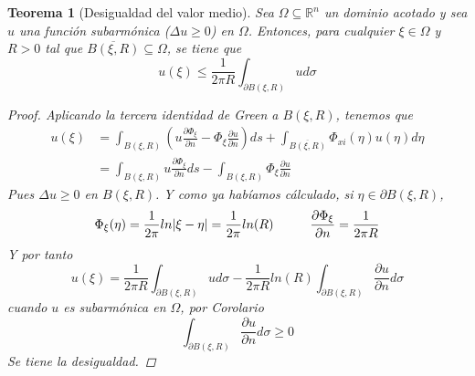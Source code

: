 \documentclass[11pt]{book}
\theoremstyle{plain}
\newtheorem{teo}[proposición]{Teorema}
\theoremstyle{definition}
\newcommand{\R}{\mathbb{R}}
\begin{document}
    \begin{teo}[Desigualdad del valor medio]
        Sea $\Omega \subseteq \R^{n}$ un dominio acotado y sea $u$ una función subarmónica ($\Delta u \geq 0$) en $\Omega$. Entonces, para cualquier $\xi\in\Omega$ y $R > 0$ tal que $\overline{B(\xi,R)} \subseteq \Omega$, se tiene que
        \[
            u(\xi) \leq \frac{1}{2\pi R}\int_{\partial B(\xi,R)} u d\sigma
        \]
        \begin{proof}
            Aplicando la tercera identidad de Green a $B(\xi,R)$, tenemos que
            \begin{align*}
                u(\xi) &= \int_{B(\xi,R)} \left(u\frac{\partial \Phi_{\xi}}{\partial n} - \Phi_{\xi}\frac{\partial u}{\partial n}\right) ds + \int_{\overline{B(\xi, R)}} \Phi_{xi}(\eta)u(\eta)d\eta\\
                        &= \int_{B(\xi,R)} u\frac{\partial \Phi_{\xi}}{\partial n} ds - \int_{B(\xi,R)} \Phi_{\xi}\frac{\partial u}{\partial n}
            \end{align*}
            Pues $\Delta u \geq 0$ en $B(\xi,R)$. Y como ya habíamos cálculado, si $\eta\in \partial B(\xi, R)$,
            \[
                \Phi_{\xi}(\eta) = \frac{1}{2\pi}ln|\xi - \eta| = \frac{1}{2\pi}ln(R) \hspace{10mm} \frac{\partial \Phi_{\xi}}{\partial n} = \frac{1}{2\pi R}
            \]
            Y por tanto
            \[
                u(\xi) = \frac{1}{2\pi R}\int_{\partial B(\xi,R)} u d\sigma - \frac{1}{2\pi R}ln(R)\int_{\partial B(\xi,R)} \frac{\partial u}{\partial n} d\sigma
            \]
            cuando $u$ es subarmónica en $\Omega$, por Corolario
            \[
                \int_{\partial B(\xi,R)}\frac{\partial u}{\partial n} d\sigma \geq 0  
            \]
            Se tiene la desigualdad.
        \end{proof}
    \end{teo}
\end{document}
